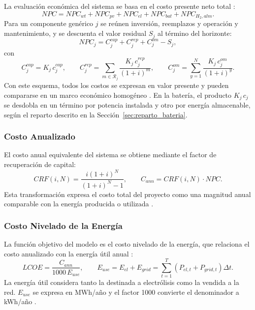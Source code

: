 La evaluación económica del sistema se basa en el costo presente neto total \cite{Li2024WPEB,Khan2022Review}:
\begin{equation}
NPC=NPC_{wt}+NPC_{pv}+NPC_{el}+NPC_{bat}+NPC_{H_2,alm}.
\end{equation}
Para un componente genérico $j$ se reúnen inversión, reemplazos y operación y mantenimiento, y se descuenta el valor residual $S_j$ al término del horizonte:
\begin{equation}
NPC_j=C^{cap}_j+C^{rep}_j+C^{om}_j-S_j,
\end{equation}
con
\begin{equation}
C^{cap}_j=K_j\,c^{cap}_j,\qquad
C^{rep}_j=\sum_{m\in\mathcal{R}_j}\frac{K_j\,c^{rep}_j}{(1+i)^m},\qquad
C^{om}_j=\sum_{y=1}^{N}\frac{K_j\,c^{om}_j}{(1+i)^y}.
\end{equation}
Con este esquema, todos los costos se expresan en valor presente y pueden compararse en un marco económico homogéneo \cite{Li2024WPEB,Khan2022Review}. En la batería, el producto $K_j\,c_j$ se desdobla en un término por potencia instalada y otro por energía almacenable, según el reparto descrito en la Sección~\ref{sec:reparto_bateria}.

\subsubsection{Costo Anualizado}

El costo anual equivalente del sistema se obtiene mediante el factor de recuperación de capital:
\begin{equation}
CRF(i,N)=\frac{i(1+i)^N}{(1+i)^N-1},\qquad
C_{ann}=CRF(i,N)\cdot NPC.
\end{equation}
Esta transformación expresa el costo total del proyecto como una magnitud anual comparable con la energía producida o utilizada \cite{Li2024WPEB,Khan2022Review}.

\subsubsection{Costo Nivelado de la Energía}

La función objetivo del modelo es el costo nivelado de la energía, que relaciona el costo anualizado con la energía útil anual \cite{Li2024WPEB,Khan2022Review}:
\begin{equation}
LCOE=\frac{C_{ann}}{1000\,E_{use}},\qquad
E_{use}=E_{el}+E_{grid}=\sum_{t=1}^{T}\left(P_{el,t}+P_{grid,t}\right)\Delta t.
\end{equation}
La energía útil considera tanto la destinada a electrólisis como la vendida a la red. $E_{use}$ se expresa en MWh/año y el factor 1000 convierte el denominador a kWh/año \cite{Li2024WPEB}.


